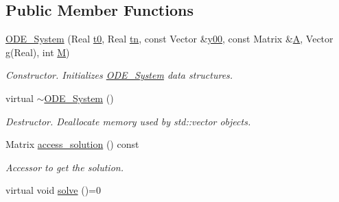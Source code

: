 \subsection*{Public Member Functions}
\begin{DoxyCompactItemize}
\item 
\mbox{\label{class_o_d_e___system_a0d26d35aa660c12699438ef46ae6cb1f}} 
\mbox{\hyperlink{class_o_d_e___system_a0d26d35aa660c12699438ef46ae6cb1f}{O\+D\+E\+\_\+\+System}} (Real \mbox{\hyperlink{class_o_d_e___system_a1947b357608babc98c5e79d645e24c3c}{t0}}, Real \mbox{\hyperlink{class_o_d_e___system_a5c5a0dd9f04dfb8d8a84d49b741773af}{tn}}, const Vector \&\mbox{\hyperlink{class_o_d_e___system_a1379137a4480e5861fd1911bc061f908}{y00}}, const Matrix \&\mbox{\hyperlink{class_o_d_e___system_a632009677e80b62a1996e842398bf8b6}{A}}, Vector \mbox{\hyperlink{class_o_d_e___system_a5a294fda765e6cbfd7dfda43755d2c55}{g}}(Real), int \mbox{\hyperlink{class_o_d_e___system_a46e5ee402ffc7c500dccad753a1fba36}{M}})
\begin{DoxyCompactList}\small\item\em Constructor. Initializes \mbox{\hyperlink{class_o_d_e___system}{O\+D\+E\+\_\+\+System}} data structures. \end{DoxyCompactList}\item 
\mbox{\label{class_o_d_e___system_a1d38890ff0950344d4d34b9fab6a956b}} 
virtual \mbox{\hyperlink{class_o_d_e___system_a1d38890ff0950344d4d34b9fab6a956b}{$\sim$\+O\+D\+E\+\_\+\+System}} ()
\begin{DoxyCompactList}\small\item\em Destructor. Deallocate memory used by std\+::vector objects. \end{DoxyCompactList}\item 
\mbox{\label{class_o_d_e___system_aebb5a7971ef1c429077155eec549f713}} 
Matrix \mbox{\hyperlink{class_o_d_e___system_aebb5a7971ef1c429077155eec549f713}{access\+\_\+solution}} () const
\begin{DoxyCompactList}\small\item\em Accessor to get the solution. \end{DoxyCompactList}\item 
\mbox{\label{class_o_d_e___system_a78a058382148b745fa458f0b9f52f47c}} 
virtual void \mbox{\hyperlink{class_o_d_e___system_a78a058382148b745fa458f0b9f52f47c}{solve}} ()=0

\end{DoxyCompactItemize}

